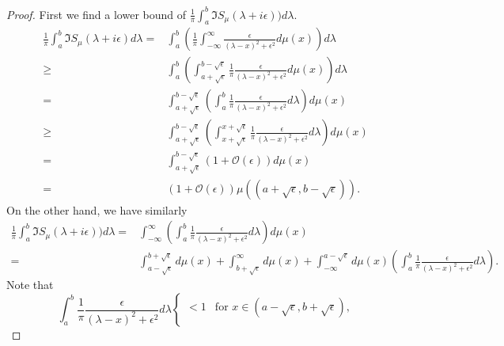\documentclass[11pt, a4paper]{article}
\numberwithin{equation}{section}
\newcommand{\bigO}{\mathcal{O}}
\theoremstyle{definition}
\theoremstyle{remark}
\begin{document}
\begin{proof}
  First we find a lower bound of $\frac{1}{\pi} \int^b_a \Im S_{\mu}(\lambda + i\epsilon)) d\lambda$.
  \begin{equation} \label{eq:lower_bound_of_Stieltjes}
    \begin{split}
      \frac{1}{\pi} \int^b_a \Im S_{\mu}(\lambda + i\epsilon) d\lambda ={}& \int^b_a \left( \frac{1}{\pi} \int^{\infty}_{-\infty} \frac{\epsilon}{(\lambda - x)^2 + \epsilon^2} d\mu(x) \right) d\lambda \\
      \geq {}& \int^b_a \left( \int^{b - \sqrt{\epsilon}}_{a + \sqrt{\epsilon}} \frac{1}{\pi} \frac{\epsilon}{(\lambda - x)^2 + \epsilon^2} d\mu(x) \right) d\lambda \\
      = {}& \int^{b - \sqrt{\epsilon}}_{a + \sqrt{\epsilon}} \left( \int^b_a \frac{1}{\pi} \frac{\epsilon}{(\lambda - x)^2 + \epsilon^2} d\lambda \right) d\mu(x) \\
      \geq {}& \int^{b - \sqrt{\epsilon}}_{a + \sqrt{\epsilon}} \left( \int^{x + \sqrt{\epsilon}}_{x + \sqrt{\epsilon}} \frac{1}{\pi} \frac{\epsilon}{(\lambda - x)^2 + \epsilon^2} d\lambda \right) d\mu(x) \\
      = {}& \int^{b - \sqrt{\epsilon}}_{a + \sqrt{\epsilon}} (1 + \bigO(\epsilon)) d\mu(x) \\
      = {}& (1 + \bigO(\epsilon)) \mu((a + \sqrt{\epsilon}, b - \sqrt{\epsilon})).
    \end{split}
  \end{equation}
  On the other hand, we have similarly
  \begin{equation}
    \begin{split}
      \frac{1}{\pi} \int^b_a \Im S_{\mu}(\lambda + i\epsilon)) d\lambda ={}& \int^{\infty}_{-\infty} \left( \int^b_a \frac{1}{\pi} \frac{\epsilon}{(\lambda - x)^2 + \epsilon^2} d\lambda \right) d\mu(x) \\
      = {}& \int^{b + \sqrt{\epsilon}}_{a - \sqrt{\epsilon}} d\mu(x) + \int^{\infty}_{b + \sqrt{\epsilon}} d\mu(x) + \int^{a - \sqrt{\epsilon}}_{-\infty} d\mu(x) \left( \int^b_a \frac{1}{\pi} \frac{\epsilon}{(\lambda - x)^2 + \epsilon^2} d\lambda \right).
    \end{split}
  \end{equation}
  Note that
  \begin{equation}
    \int^b_a \frac{1}{\pi} \frac{\epsilon}{(\lambda - x)^2 + \epsilon^2} d\lambda
    \begin{cases}
      < 1 & \text{for $x \in (a - \sqrt{\epsilon}, b + \sqrt{\epsilon})$,} \\

\end{cases}
\end{equation}
\end{proof}
\end{document}
